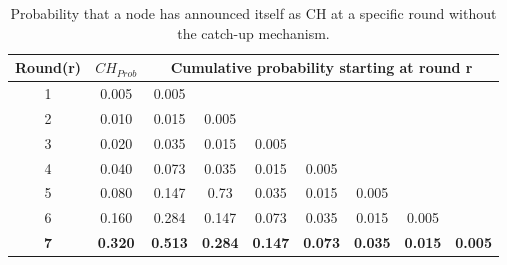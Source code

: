 \begin{table}[bt]
\centering
\caption{Probability that a node has announced itself as CH at a specific round without the catch-up mechanism.}
\label{tab:prob-no-catchup}
\begin{tabular}{|c|c|c|cccccc|}
\hline
\textbf{Round(r)} & \textbf{$CH_{Prob}$} & \multicolumn{7}{c|}{\textbf{Cumulative probability starting at round r}}                                                                                       \\ \hline
1                 & 0.005                & 0.005 &                            &                            &                            &                            &                            &       \\ \cline{1-4}
2                 & 0.010                & 0.015 & \multicolumn{1}{c|}{0.005} &                            &                            &                            &                            &       \\ \cline{1-5}
3                 & 0.020                & 0.035 & \multicolumn{1}{c|}{0.015} & \multicolumn{1}{c|}{0.005} &                            &                            &                            &       \\ \cline{1-6}
4                 & 0.040                & 0.073 & \multicolumn{1}{c|}{0.035} & \multicolumn{1}{c|}{0.015} & \multicolumn{1}{c|}{0.005} &                            &                            &       \\ \cline{1-7}
5                 & 0.080                & 0.147 & \multicolumn{1}{c|}{0.73}  & \multicolumn{1}{c|}{0.035} & \multicolumn{1}{c|}{0.015} & \multicolumn{1}{c|}{0.005} &                            &       \\ \cline{1-8}
6                 & 0.160                & 0.284 & \multicolumn{1}{c|}{0.147} & \multicolumn{1}{c|}{0.073} & \multicolumn{1}{c|}{0.035} & \multicolumn{1}{c|}{0.015} & \multicolumn{1}{c|}{0.005} &       \\ \hline
\textbf{7}                 & \textbf{0.320}                & \textbf{0.513} & \multicolumn{1}{c|}{\textbf{0.284}} & \multicolumn{1}{c|}{\textbf{0.147}} & \multicolumn{1}{c|}{\textbf{0.073}} & \multicolumn{1}{c|}{\textbf{0.035}} & \multicolumn{1}{c|}{\textbf{0.015}} & \textbf{0.005} \\ \hline
\end{tabular}
\end{table}

